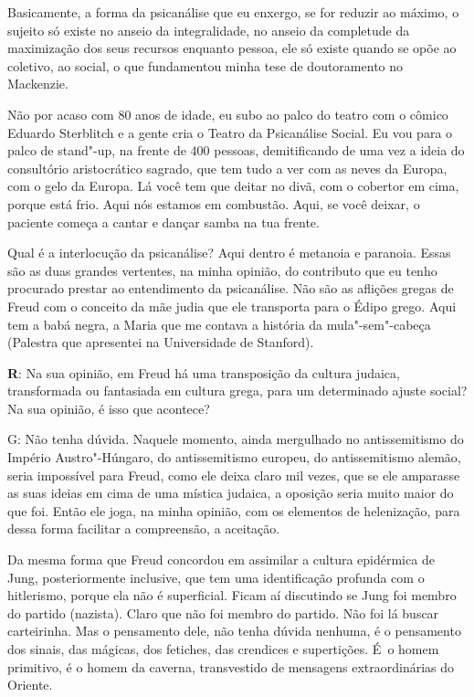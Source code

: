  

Basicamente, a forma da psicanálise que eu enxergo, se for reduzir ao
máximo, o sujeito só existe no anseio da integralidade, no anseio da
completude da maximização dos seus recursos enquanto pessoa, ele só
existe quando se opõe ao coletivo, ao social, o que fundamentou minha
tese de doutoramento no Mackenzie.

 

Não por acaso com 80 anos de idade, eu subo ao palco do teatro com o
cômico Eduardo Sterblitch e a gente cria o Teatro da Psicanálise Social.
Eu vou para o palco de stand"-up, na frente de 400 pessoas, demitificando
de uma vez a ideia do consultório aristocrático sagrado, que tem tudo a
ver com as neves da Europa, com o gelo da Europa. Lá você tem que deitar
no divã, com o cobertor em cima, porque está frio. Aqui nós estamos em
combustão. Aqui, se você deixar, o paciente começa a cantar e dançar
samba na tua frente.

 

Qual é a interlocução da psicanálise? Aqui dentro é metanoia e paranoia.
Essas são as duas grandes vertentes, na minha opinião, do contributo que
eu tenho procurado prestar ao entendimento da psicanálise. Não são as
aflições gregas de Freud com o conceito da mãe judia que ele transporta
para o Édipo grego. Aqui tem a babá negra, a Maria que me contava a
história da mula"-sem"-cabeça (Palestra que apresentei na Universidade de
Stanford).

 

\textbf{R}: Na sua opinião, em Freud há uma transposição da cultura
judaica, transformada ou fantasiada em cultura grega, para um
determinado ajuste social? Na sua opinião, é isso que acontece?

 

G: Não tenha dúvida. Naquele momento, ainda mergulhado no antissemitismo
do Império Austro"-Húngaro, do antissemitismo europeu, do antissemitismo
alemão, seria impossível para Freud, como ele deixa claro mil vezes, que
se ele amparasse as suas ideias em cima de uma mística judaica, a oposição seria muito maior do que foi. Então ele joga, na minha opinião,
com os elementos de helenização, para dessa forma facilitar a
compreensão, a aceitação.

 

Da mesma forma que Freud concordou em assimilar a cultura epidérmica de
Jung, posteriormente inclusive, que tem uma identificação profunda com o
hitlerismo, porque ela não é superficial. Ficam aí discutindo se Jung
foi membro do partido (nazista). Claro que não foi membro do partido.
Não foi lá buscar carteirinha. Mas o pensamento dele, não tenha dúvida
nenhuma, é o pensamento dos sinais, das mágicas, dos fetiches, das
crendices e supertições. É~o homem primitivo, é o homem da caverna,
transvestido de mensagens extraordinárias do Oriente.


